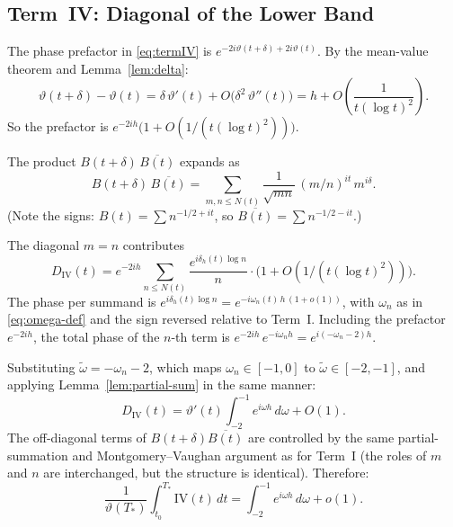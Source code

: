 \documentclass[11pt]{article}
\theoremstyle{plain}
\theoremstyle{definition}
\begin{document}
\subsection*{Term~IV: Diagonal of the Lower Band}

The phase prefactor in \eqref{eq:termIV} is
$e^{-2i\vartheta(t+\delta)+2i\vartheta(t)}$.
By the mean-value theorem and Lemma~\ref{lem:delta}:
\begin{equation}\label{eq:phase-shift}
\vartheta(t+\delta)-\vartheta(t)
= \delta\,\vartheta'(t) + O\bigl(\delta^2\,\vartheta''(t)\bigr)
= h + O\!\left(\frac{1}{t(\log t)^2}\right).
\end{equation}
So the prefactor is
$e^{-2ih}\bigl(1+O(1/(t(\log t)^2))\bigr)$.

The product $B(t+\delta)\,\overline{B(t)}$ expands as
\[
B(t+\delta)\,\overline{B(t)}
= \sum_{m,n\le N(t)} \frac{1}{\sqrt{mn}}\,(m/n)^{it}\,m^{i\delta}.
\]
(Note the signs: $B(t)=\sum n^{-1/2+it}$,
so $\overline{B(t)}=\sum n^{-1/2-it}$.)

The diagonal $m=n$ contributes
\[
D_{\mathrm{IV}}(t)
= e^{-2ih}\sum_{n\le N(t)}\frac{e^{i\delta_h(t)\log n}}{n}
  \cdot\bigl(1+O(1/(t(\log t)^2))\bigr).
\]
The phase per summand is $e^{i\delta_h(t)\log n}
= e^{-i\omega_n(t)\,h\,(1+o(1))}$,
with $\omega_n$ as in \eqref{eq:omega-def} and the sign
reversed relative to Term~I.
Including the prefactor $e^{-2ih}$,
the total phase of the $n$-th term is
$e^{-2ih}\,e^{-i\omega_n h} = e^{i(-\omega_n-2)h}$.

Substituting $\tilde\omega = -\omega_n - 2$,
which maps $\omega_n\in[-1,0]$ to $\tilde\omega\in[-2,-1]$,
and applying Lemma~\ref{lem:partial-sum} in the same manner:
\begin{equation}\label{eq:diagIV-value}
D_{\mathrm{IV}}(t)
= \vartheta'(t)\int_{-2}^{-1} e^{i\omega h}\,d\omega + O(1).
\end{equation}
The off-diagonal terms of $B(t+\delta)\overline{B(t)}$ are controlled
by the same partial-summation and Montgomery--Vaughan argument as
for Term~I (the roles of $m$ and $n$ are interchanged, but the
structure is identical). Therefore:
\begin{equation}\label{eq:termIV-cesaro}
\frac{1}{\vartheta(T_*)}
\int_{t_0}^{T_*}\mathrm{IV}(t)\,dt
= \int_{-2}^{-1} e^{i\omega h}\,d\omega + o(1).
\end{equation}

\end{document}
